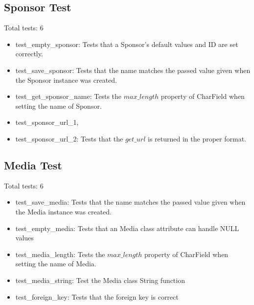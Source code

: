 \documentclass[12pt,english]{scrartcl}
\begin{document}
\subsection{Sponsor Test} 
Total tests: 6
\begin{itemize}
\item test\_empty\_sponsor: Tests that a Sponsor's default values and ID are set correctly.
 
\item test\_save\_sponsor: Tests that the name matches the passed value given when the Sponsor instance was created.  
 
\item test\_get\_sponsor\_name: Tests the $max\_length$ property of CharField when setting the name of Sponsor.

\item test\_sponsor\_url\_1, \item test\_sponsor\_url\_2: Tests that the $get\_url$ is returned in the proper format.
\end{itemize}

\subsection{Media Test}

Total tests: 6

\begin{itemize}

\item test\_save\_media: Tests that the name matches the passed value given when the Media instance was created.

\item test\_empty\_media: Tests that an Media class attribute can handle NULL values

\item test\_media\_length: Tests the $max\_length$ property of CharField when setting the name of Media.

\item test\_media\_string: Test the Media class String function

\item test\_foreign_key: Tests that the foreign key is correct

\end{itemize}
\end{document}
